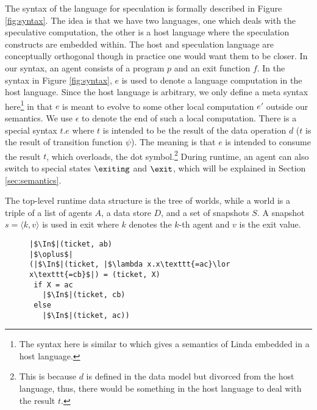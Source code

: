 The syntax of the language for speculation is 
formally described in Figure \ref{fig:syntax}. 
The idea is that we have two languages, one which deals with the speculative
computation, the other is a host language where the speculation constructs
are embedded within.
The host and speculation language are conceptually orthogonal though
in practice one would want them to be closer.
In our syntax, an agent consists of a program $p$ and an exit function $f$. 
In the syntax in Figure \ref{fig:syntax}, $e$ is used to denote a language
computation in the host language. Since the host language is arbitrary, we
only define a meta syntax here\footnote{
The syntax here is similar to \cite{Ciancarini95} which gives a semantics
of Linda embedded in a host language.
}
in that $e$ is meant to evolve to some other
local computation $e'$ outside our semantics.
We use $\epsilon$ to denote the end of such a local computation. 
There is a special syntax $t.e$ where $t$ is intended to be the
result of the data operation $d$ ($t$ is the result of transition function $\psi$).
The meaning is that $e$ is intended to consume the result $t$, which overloads,
the dot symbol.\footnote{
This is because $d$ is defined in the data model but divorced from the host
language, thus, there would be something in the host language to deal with
the result $t$.
}
During runtime, an agent can also switch to special states $\exiting$ and $\exit$, 
which will be explained in Section \ref{sec:semantics}. 

The top-level runtime data structure is the tree of worlds,
while a world is a triple of a list of agents $A$, 
a data store $D$, and a set of snapshots $S$. 
A snapshot $s=\langle k,v\rangle$ is used in exit 
where $k$ denotes the $k$-th agent and $v$ is the exit value. 
%

\begin{figure}[tb]
\begin{lstlisting}[caption={Speculation Example using Tuple Space. 
We use \texttt{(...)} to denote tuples and
$\lambda x.\varphi(x)$ denotes a condition for $\In$ and $\Rd$ on the specific field in a tuple, where $\varphi$ is the condition expression such as ``$x\texttt{=ac}\lor x\texttt{=cb}$'' which means $x$ is equal to either {\tt ac} or {\tt cb}.},label=lst:ts-example]
|$\In$|(ticket, ab)
|$\oplus$|
(|$\In$|(ticket, |$\lambda x.x\texttt{=ac}\lor x\texttt{=cb}$|) = (ticket, X)
 if X = ac
   |$\In$|(ticket, cb)
 else
   |$\In$|(ticket, ac))
\end{lstlisting}
\end{figure}

